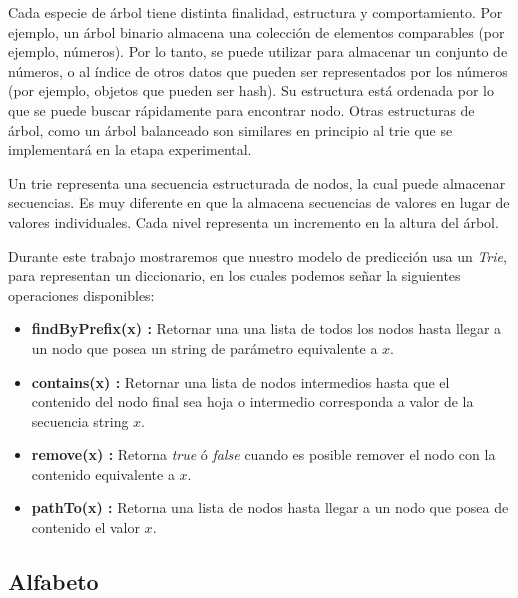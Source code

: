 Cada especie de árbol tiene distinta finalidad, estructura y comportamiento. Por ejemplo, un árbol binario almacena una colección de elementos comparables (por ejemplo, números). Por lo tanto, se puede utilizar para almacenar un conjunto de números, o al índice de otros datos que pueden ser representados por los números (por ejemplo, objetos que pueden ser hash). Su estructura está ordenada por lo que se puede buscar rápidamente para encontrar nodo. Otras estructuras de árbol, como un árbol balanceado son similares en principio al trie que se implementará en la etapa experimental.

Un trie representa una secuencia  estructurada de nodos, la cual puede almacenar secuencias. %
Es muy diferente en que la almacena secuencias de valores en lugar de valores individuales. Cada nivel representa un incremento en la altura del árbol.


Durante este trabajo mostraremos que nuestro modelo de predicción usa un \emph{Trie}, para representan un diccionario, en los cuales podemos señar la siguientes operaciones disponibles:

	\begin{itemize}
	
		\item \textbf{findByPrefix(x) :}  Retornar una una lista de todos los nodos hasta llegar a un nodo que posea un string de parámetro equivalente a $x$.
		
		\item \textbf{contains(x) :} Retornar una lista de nodos intermedios hasta que el contenido del nodo final sea hoja o intermedio corresponda a valor de la secuencia string $x$.
		
		\item \textbf{remove(x) :} Retorna \emph{true} ó \emph{false} cuando es posible remover el nodo con la contenido equivalente a $x$.
		
		\item \textbf{pathTo(x) :} Retorna una lista de nodos hasta llegar a un nodo que posea de contenido el valor $x$.
		
	
	\end{itemize}







\subsection{Alfabeto}

